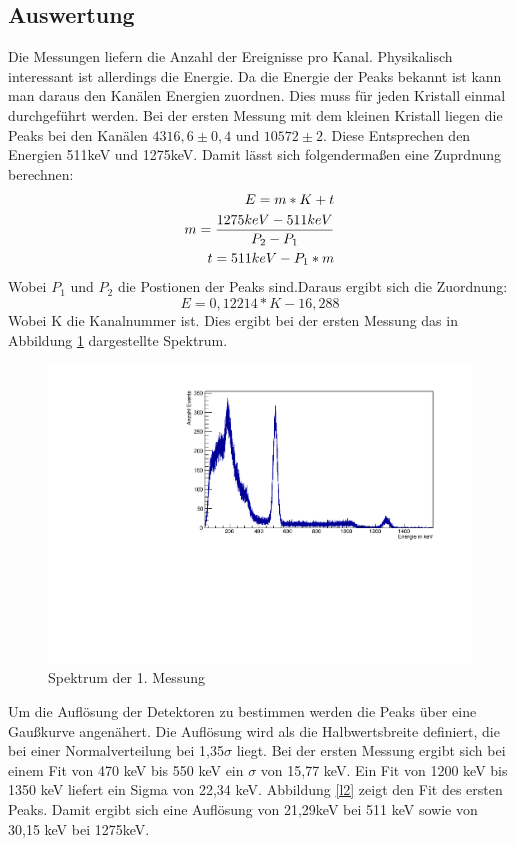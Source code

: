 \documentclass[a4paper,14pt,twoside]{article}
\begin{document}
\subsection{Auswertung}
Die Messungen liefern die Anzahl der Ereignisse pro Kanal. Physikalisch interessant ist allerdings die Energie. Da die Energie der Peaks bekannt ist kann man daraus den Kanälen Energien zuordnen. Dies muss für jeden Kristall einmal durchgeführt werden. Bei der ersten Messung mit dem kleinen Kristall liegen die Peaks bei den Kanälen $4316,6\pm0,4$ und $10572\pm2$. Diese Entsprechen den Energien 511keV und 1275keV.
Damit lässt sich folgendermaßen eine Zuprdnung berechnen:
\begin{align}
E=m*K+t\\
m={{1275keV-511keV}\over{P_2-P_1}}\\
t=511keV-P_1*m
\end{align}
Wobei $P_1$ und $P_2$ die Postionen der Peaks sind.Daraus ergibt sich die Zuordnung:
\begin{equation}
E=0,12214*K-16,288
\end{equation}
Wobei K die Kanalnummer ist.
Dies ergibt bei der ersten Messung das in Abbildung \ref{l1} dargestellte Spektrum.
\begin{figure}[H]
	\begin{center}
	\includegraphics[width=0.7\linewidth]{Messung11.pdf}
	\caption{Spektrum der 1. Messung}
	\label{l1}
	\end{center}
\end{figure}
Um die Auflösung der Detektoren zu bestimmen werden die Peaks über eine Gaußkurve angenähert. Die Auflösung wird als die Halbwertsbreite definiert, die bei einer Normalverteilung bei 1,35$\sigma$ liegt. Bei der ersten Messung ergibt sich bei einem Fit von 470 keV bis 550 keV ein $\sigma$ von 15,77 keV. Ein Fit von 1200 keV bis 1350 keV liefert ein Sigma von 22,34 keV. Abbildung \ref{l2} zeigt den Fit des ersten Peaks. Damit ergibt sich eine Auflösung von 21,29keV bei 511 keV sowie von 30,15 keV bei 1275keV.
\end{document}
